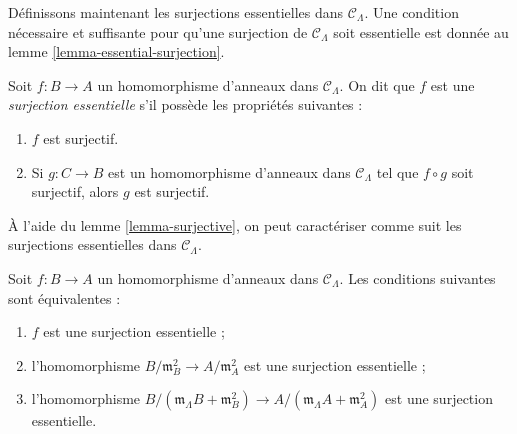 \noindent
Définissons maintenant les surjections essentielles dans
$\mathcal{C}_\Lambda$. Une condition nécessaire et suffisante pour qu'une
surjection de $\mathcal{C}_\Lambda$ soit essentielle est donnée au lemme
\ref{lemma-essential-surjection}.

\begin{definition}
\label{definition-essential-surjection}
Soit $f: B \to A$ un homomorphisme d'anneaux dans $\mathcal{C}_\Lambda$.
On dit que $f$ est une {\it surjection essentielle} s'il possède les
propriétés suivantes :
\begin{enumerate}
\item $f$ est surjectif.
\item Si $g: C \to B$ est un homomorphisme d'anneaux dans
$\mathcal{C}_\Lambda$ tel que $f \circ g$ soit surjectif, alors $g$ est
surjectif.
\end{enumerate}
\end{definition}

\noindent
À l'aide du lemme \ref{lemma-surjective}, on peut caractériser comme suit les
surjections essentielles dans $\mathcal{C}_\Lambda$.

\begin{lemma}
\label{lemma-essential-surjection-mod-squares}
Soit $f: B \to A$ un homomorphisme d'anneaux dans $\mathcal{C}_\Lambda$.
Les conditions suivantes sont équivalentes :
\begin{enumerate}
\item $f$ est une surjection essentielle ;
\item l'homomorphisme $B/\mathfrak m_B^2 \to A/\mathfrak m_A^2$ est une
surjection essentielle ;
\item l'homomorphisme
$B/(\mathfrak m_\Lambda B + \mathfrak m_B^2) \to
A/(\mathfrak m_\Lambda A + \mathfrak m_A^2)$ est une surjection essentielle.
\end{enumerate}
\end{lemma}

